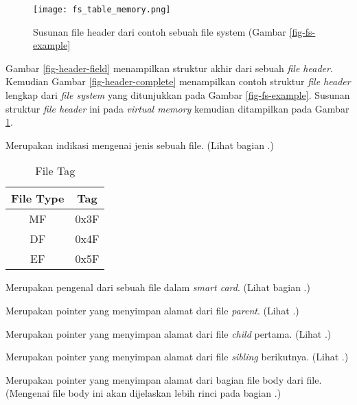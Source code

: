 \begin{figure}
\centering
\texttt{[image: fs\_table\_memory.png]}
\caption{Susunan file header dari contoh sebuah file system (Gambar \ref{fig-fs-example}}
\label{fig-header-memory}
\end{figure}

Gambar \ref{fig-header-field} menampilkan struktur akhir dari sebuah {\em file header}. Kemudian Gambar \ref{fig-header-complete} menampilkan contoh struktur {\em file header} lengkap dari {\em file system} yang ditunjukkan pada Gambar \ref{fig-fs-example}. Susunan struktur {\em file header} ini pada {\em virtual memory} kemudian ditampilkan pada Gambar \ref{fig-header-memory}.


\begin{description}[leftmargin=2.5cm,style=sameline]

\item[Tag] Merupakan indikasi mengenai jenis sebuah file. (Lihat bagian .)

\begin{table}[htbp]
  \centering
  \begin{tabular}{|c|c|}
    \hline
    File Type & Tag\\[5pt]
    \hline
    MF        & 0x3F\\
    DF        & 0x4F\\
    EF        & 0x5F\\
    \hline
  \end{tabular}
  \caption{File Tag}
  \label{"tbl-file-tag}
\end{table}


\item[FID] Merupakan pengenal dari sebuah file dalam \textsl{smart card}. (Lihat bagian .)

\item[Parent] Merupakan pointer yang menyimpan alamat dari file {\em parent}. (Lihat .)

\item[Child] Merupakan pointer yang menyimpan alamat dari file {\em child} pertama. (Lihat .)

\item[Sibling] Merupakan pointer yang menyimpan alamat dari file {\em sibling} berikutnya. (Lihat .)

\item[File Body] Merupakan pointer yang menyimpan alamat dari bagian file body dari file. (Mengenai file body ini akan dijelaskan lebih rinci pada bagian .)

\end{description}


